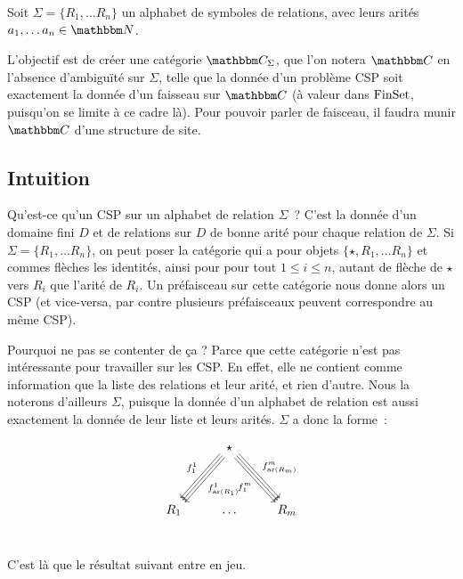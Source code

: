 
Soit $\Sigma = \{R_1, \dots R_n\}$ un alphabet de symboles de relations, avec
leurs arités $a_1, \dots a_n\in\N$.

L'objectif est de créer une catégorie $\C_\Sigma$, que l'on notera $\C$ en l'absence
d'ambiguïté sur $\Sigma$, telle que la donnée d'un problème CSP soit exactement la donnée
d'un faisseau sur $\C$ (à valeur dans $\text{FinSet}$, puisqu'on se limite à ce cadre là). Pour
pouvoir parler de faisceau, il faudra munir $\C$ d'une structure de site.

\subsection{Intuition}

Qu'est-ce qu'un CSP
sur un alphabet de relation $\Sigma$~? C'est la donnée d'un domaine fini $D$ et
de relations sur $D$ de bonne arité pour chaque relation de $\Sigma$. Si
$\Sigma = \{R_1, \dots R_n\}$, on peut poser la catégorie qui a pour objets
$\{\star, R_1, \dots R_n\}$ et commes flèches les identités, ainsi pour pour
tout $1\leq i\leq n$, autant de flèche de $\star$ vers $R_i$ que l'arité de
$R_i$. Un préfaisceau sur cette catégorie nous donne alors un CSP (et
vice-versa, par contre plusieurs préfaisceaux peuvent correspondre au même
CSP).

Pourquoi ne pas se contenter de ça ? Parce que cette catégorie n'est pas
intéressante pour travailler sur les CSP. En effet, elle ne contient comme
information que la liste des relations et leur arité, et rien d'autre. Nous la
noterons d'ailleurs $\Sigma$, puisque la donnée d'un alphabet de relation est
aussi exactement la donnée de leur liste et leurs arités. $\Sigma$ a donc la forme~:

\[\begin{tikzcd}
    & \star \arrow[ddl, shift right, swap, "f_1^1"]
            \arrow[ddl]
            \arrow[ddl, shift left, "f_{\text{ar}(R_1)}^1"]
            \arrow[ddr, shift right, swap, "f_1^m"]
            \arrow[ddr]
            \arrow[ddr, shift left, "f_{\text{ar}(R_m)}^m"]
            \\
    & & \\
    R_1 & \dots & R_m \\
\end{tikzcd}\]

C'est là que le résultat suivant entre en jeu.

